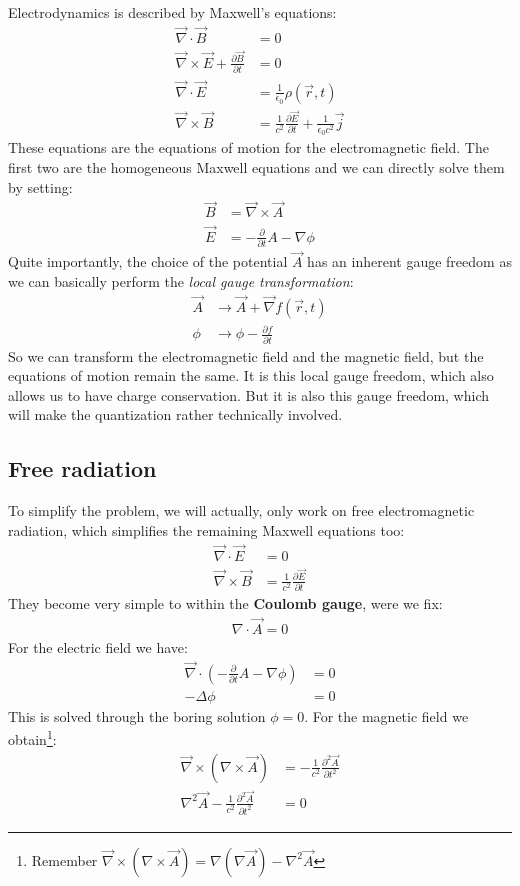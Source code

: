 \documentclass[10pt]{article}
\begin{document}
Electrodynamics is described by Maxwell's equations:
\begin{align}
\vec{\nabla} \cdot \vec{B} &= 0\\
\vec{\nabla} \times \vec{E} + \frac{\partial \vec{B}}{\partial t}&=0\\
\vec{\nabla} \cdot \vec{E} &= \frac{1}{\epsilon_0}\rho(\vec{r},t) \\
\vec{\nabla} \times \vec{B} &= \frac{1}{c^2} \frac{\partial \vec{E}}{\partial t}+\frac{1}{\epsilon_0 c^2}\vec{j}
\end{align}
These equations are the equations of motion for the electromagnetic field. The first two are the homogeneous Maxwell equations and we can directly solve them by setting:
\begin{align}
\vec{B} &= \vec{\nabla}\times\vec{A}\\
\vec{E}&= -\frac{\partial}{\partial t}A-\nabla \phi
\end{align}
Quite importantly, the choice of the potential $\vec{A}$  has an inherent gauge freedom as we can basically perform the \textit{local gauge transformation}:
\begin{align}\label{Eq:PotPolar}
\vec{A} &\rightarrow \vec{A} + \vec{\nabla} f (\vec{r},t)\\
\phi &\rightarrow \phi - \frac{\partial f}{\partial t}
\end{align}
So we can transform the electromagnetic field and the magnetic field, but the equations of motion remain the same. It is this local gauge freedom, which also allows us to have charge conservation. But it is also this gauge freedom, which will make the quantization rather technically involved. 

\subsection{Free radiation}
To simplify the problem, we will actually, only work on free electromagnetic radiation, which simplifies the remaining Maxwell equations too:
\begin{align}
\vec{\nabla} \cdot \vec{E} &= 0 \\
\vec{\nabla} \times \vec{B} &= \frac{1}{c^2} \frac{\partial\vec{E}}{\partial t}
\end{align}
They become very simple to within the \textbf{Coulomb gauge}, were we fix:
\begin{align}\label{Eq:CouGauge}
\nabla \cdot \vec{A} = 0
\end{align}
For the electric field we have:
\begin{align}
\vec{\nabla} \cdot \left(-\frac{\partial}{\partial t}A-\nabla \phi\right) &= 0 \\
-\Delta \phi &= 0
\end{align}
This is solved through the boring solution $\phi = 0$. For the magnetic field we obtain\footnote{Remember $\vec{\nabla} \times (\nabla \times \vec{A}) =\nabla(\nabla \vec{A})-\nabla^2 \vec{A}$}:
\begin{align}
\vec{\nabla} \times (\nabla \times \vec{A}) &= -\frac{1}{c^2} \frac{\partial^2\vec{A}}{\partial t^2}\\
\nabla^2 \vec{A}  -\frac{1}{c^2} \frac{\partial^2\vec{A}}{\partial t^2}&=0
\end{align}
\end{document}
